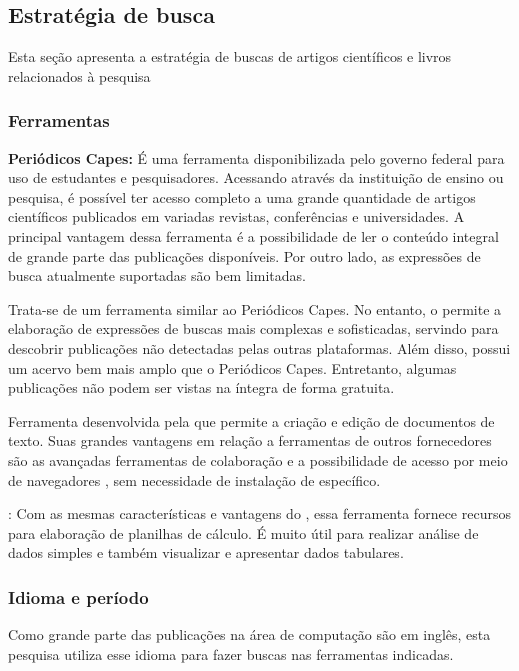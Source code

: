 \subsection{Estratégia de busca}
Esta seção apresenta a estratégia de buscas de artigos científicos e livros relacionados à pesquisa

\subsubsection{Ferramentas}
\textbf{Periódicos Capes:} É uma ferramenta disponibilizada pelo governo federal para uso de estudantes e pesquisadores. Acessando através da instituição de ensino ou pesquisa, é possível ter acesso completo a uma grande quantidade de artigos científicos publicados em variadas revistas, conferências e universidades. A principal vantagem dessa ferramenta é a possibilidade de ler o conteúdo integral de grande parte das publicações disponíveis. Por outro lado, as expressões de busca atualmente suportadas são bem limitadas.

\textbf{} Trata-se de um ferramenta similar ao Periódicos Capes. No entanto, o  permite a elaboração de expressões de buscas mais complexas e sofisticadas, servindo para descobrir publicações não detectadas pelas outras plataformas. Além disso, possui um acervo bem mais amplo que o Periódicos Capes. Entretanto, algumas publicações não podem ser vistas na íntegra de forma gratuita.

\textbf{} Ferramenta desenvolvida pela  que permite a criação e edição de documentos de texto. Suas grandes vantagens em relação a ferramentas de outros fornecedores são as avançadas ferramentas de colaboração e a possibilidade de acesso por meio de navegadores , sem necessidade de instalação de  específico.

\textbf{}: Com as mesmas características e vantagens do , essa ferramenta fornece recursos para elaboração de planilhas de cálculo. É muito útil para realizar análise de dados simples e também visualizar e apresentar dados tabulares.

\subsubsection{Idioma e período}
Como grande parte das publicações na área de computação são em inglês, esta pesquisa utiliza esse idioma para fazer buscas nas ferramentas indicadas.

